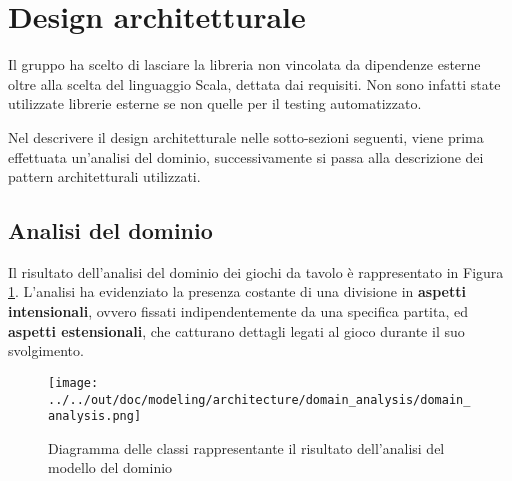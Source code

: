 \section{Design architetturale}




Il gruppo ha scelto di lasciare la libreria non vincolata da dipendenze esterne oltre alla scelta del linguaggio Scala, dettata dai requisiti.
%
Non sono infatti state utilizzate librerie esterne se non quelle per il testing automatizzato.

Nel descrivere il design architetturale nelle sotto-sezioni seguenti, viene prima effettuata un'analisi del dominio, successivamente si passa alla descrizione dei pattern architetturali utilizzati.

\subsection{Analisi del dominio}

Il risultato dell'analisi del dominio dei giochi da tavolo è rappresentato in Figura \ref{fig:domain_analysis}.
%
L'analisi ha evidenziato la presenza costante di una divisione in \textbf{aspetti intensionali}, ovvero fissati indipendentemente da una specifica partita, ed \textbf{aspetti estensionali}, che catturano dettagli legati al gioco durante il suo svolgimento.

\begin{figure}
  \centering
  \texttt{[image: ../../out/doc/modeling/architecture/domain\_analysis/domain\_analysis.png]}
  \caption{Diagramma delle classi rappresentante il risultato dell'analisi del modello del dominio}
  \label{fig:domain_analysis}
\end{figure}

